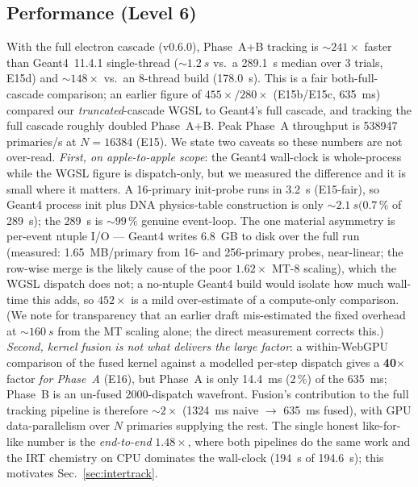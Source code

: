 \documentclass[11pt]{article}
\begin{document}
\subsection{Performance (Level 6)}
With the full electron cascade (v0.6.0), Phase~A+B tracking is
\textbf{${\sim}241\times$} faster than Geant4~11.4.1 single-thread
(${\sim}\SI{1.2}{s}$ vs.\ a \SI{289.1}{s} median over 3 trials, E15d) and
\textbf{${\sim}148\times$} vs.\ an 8-thread build (\SI{178.0}{s}). This is a
fair both-full-cascade comparison; an earlier figure of $455\times/280\times$
(E15b/E15c, \SI{635}{ms}) compared our \emph{truncated}-cascade WGSL to Geant4's
full cascade, and tracking the full cascade roughly doubled Phase~A+B. Peak
Phase~A throughput is \num{538947} primaries/s at $N=16384$ (E15). We state
two caveats so these numbers are not over-read. \emph{First, on
apple-to-apple scope}: the Geant4 wall-clock is whole-process while the WGSL
figure is dispatch-only, but we measured the difference and it is small
where it matters. A 16-primary init-probe runs in \SI{3.2}{s} (E15-fair), so
Geant4 process init plus DNA physics-table construction is only
${\sim}\SI{2.1}{s} (0.7\,\%$ of \SI{289}{s}); the \SI{289}{s} is ${\sim}99\,\%$
genuine event-loop. The one material asymmetry is
per-event ntuple I/O --- Geant4 writes \SI{6.8}{GB} to disk over the full run
(measured: \SI{1.65}{MB}/primary from 16- and 256-primary probes, near-linear;
the row-wise merge is the likely cause of the poor $1.62\times$ MT-8 scaling),
which the WGSL dispatch does not; a no-ntuple Geant4 build would isolate how
much wall-time this adds, so $452\times$ is a mild over-estimate of a
compute-only comparison. (We
note for transparency that an earlier draft mis-estimated the fixed overhead
at ${\sim}\SI{160}{s}$ from the MT scaling alone; the direct measurement
corrects this.) \emph{Second, kernel fusion is not what delivers the large
factor}:
a within-WebGPU comparison of the fused kernel against a modelled per-step
dispatch gives a \textbf{40$\times$} factor \emph{for Phase~A} (E16), but
Phase~A is only \SI{14.4}{ms} (2\,\%) of the \SI{635}{ms}; Phase~B is an
un-fused 2000-dispatch wavefront. Fusion's contribution to the full tracking
pipeline is therefore ${\sim}2\times$ (\SI{1324}{ms} naive $\to$
\SI{635}{ms} fused), with GPU data-parallelism over $N$ primaries supplying
the rest. The single honest like-for-like number is the \emph{end-to-end}
$1.48\times$, where both pipelines do the same work and the IRT chemistry on
CPU dominates the wall-clock (\SI{194}{s} of \SI{194.6}{s}); this motivates
Sec.~\ref{sec:intertrack}.
\end{document}

